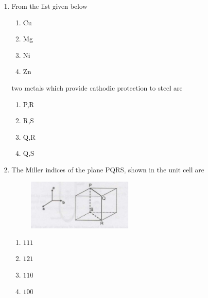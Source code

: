 \documentclass[journal]{IEEEtran}
\theoremstyle{remark}
\begin{document}
\begin{enumerate}
\begin{figure}[H]
    \caption{}
    \end{figure}
\begin{multicols}{4}
\begin{enumerate}
    \item $M1$
    \item $M2$
    \item $M3$
    \item $M4$
\end{enumerate}
\end{multicols}
\item From the list given below 
\begin{enumerate}[label=\Alph*),start = 16]
    \item Cu
    \item Mg
    \item Ni
    \item Zn
\end{enumerate}
two metals which provide cathodic protection to steel are\hfill{}
\begin{multicols}{4}
\begin{enumerate}
    \item P,R
    \item R,S
    \item Q,R
    \item Q,S
\end{enumerate}
    
\end{multicols}


\item The Miller indices of the plane PQRS, shown in the unit cell are\hfill{}
\begin{figure}[H]
    \centering
    \includegraphics[width=0.5\textwidth]{figs/Q.14.png}
    \caption{}
    \label{fig:01}
\end{figure}
\begin{multicols}{4}
\begin{enumerate}
\item $111$
\item$121$
\item $110$
\item $100$
\end{enumerate}
\end{multicols}


\end{enumerate}
\end{document}
